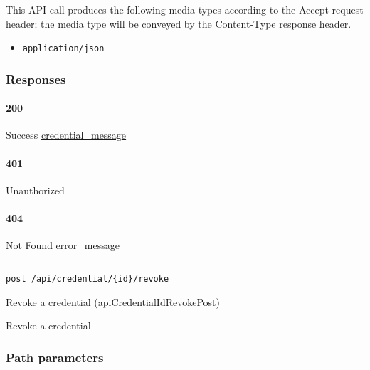 This API call produces the following media types according to the
{Accept} request header; the media type will be conveyed by the
{Content-Type} response header.

\begin{itemize}
\tightlist
\item
  \texttt{application/json}
\end{itemize}

\hypertarget{responses-29}{%
\subsubsection{Responses}\label{responses-29}}

\hypertarget{section-96}{%
\paragraph{200}\label{section-96}}

Success \protect\hyperlink{credential_message}{credential\_message}

\hypertarget{section-97}{%
\paragraph{401}\label{section-97}}

Unauthorized \protect\hyperlink{}{}

\hypertarget{section-98}{%
\paragraph{404}\label{section-98}}

Not Found \protect\hyperlink{error_message}{error\_message}

\begin{center}\rule{0.5\linewidth}{\linethickness}\end{center}

\protect\hypertarget{apiCredentialIdRevokePost}{}{}

\begin{verbatim}
post /api/credential/{id}/revoke
\end{verbatim}

Revoke a credential ({apiCredentialIdRevokePost})

Revoke a credential

\hypertarget{path-parameters-17}{%
\subsubsection{Path parameters}\label{path-parameters-17}}

